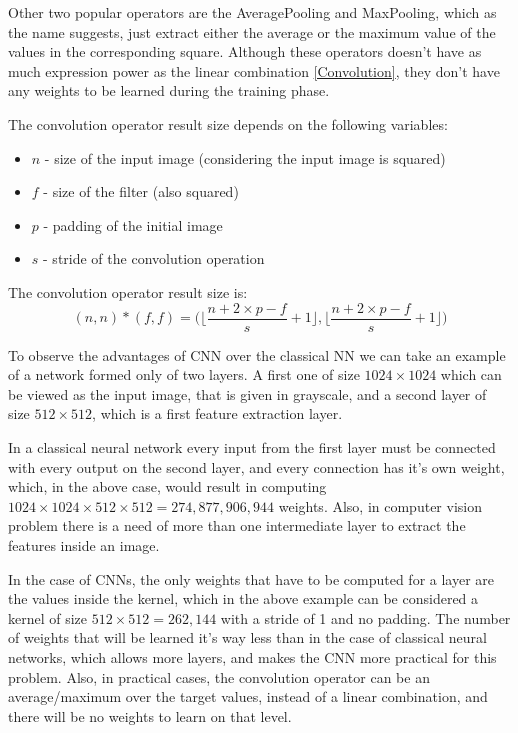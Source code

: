 Other two popular operators are the AveragePooling and MaxPooling, which as the name suggests, just extract either the average or the maximum value of the values in the corresponding square. Although these operators doesn't have as much expression power as the linear combination \ref{Convolution}, they don't have any weights to be learned during the training phase.

The convolution operator result size depends on the following variables:
\begin{itemize}
	\item $n$ - size of the input image (considering the input image is squared)
	\item $f$ - size of the filter (also squared)
	\item $p$ - padding of the initial image
	\item $s$ - stride of the convolution operation
\end{itemize}
The convolution operator result size is:
$$ (n, n) * (f, f) = \bigg( \bigg\lfloor \frac{n + 2 \times p - f}{s} + 1 \bigg\rfloor , \bigg\lfloor \frac{n + 2 \times p - f}{s} + 1 \bigg\rfloor \bigg)$$

To observe the advantages of CNN over the classical NN we can take an example of a network formed only of two layers. A first one of size $1024\times1024$ which can be viewed as the input image, that is given in grayscale, and a second layer of size $512\times512$, which is a first feature extraction layer.

In a classical neural network every input from the first layer must be connected with every output on the second layer, and every connection has it's own weight, which, in the above case, would result in computing $1024 \times 1024 \times 512 \times 512 = 274,877,906,944$ weights. Also, in computer vision problem there is a need of more than one intermediate layer to extract the features inside an image.

In the case of CNNs, the only weights that have to be computed for a layer are the values inside the kernel, which in the above example can be considered a kernel of size $512 \times 512 = 262,144‬$ with a stride of 1 and no padding. The number of weights that will be learned it's way less than in the case of classical neural networks, which allows more layers, and makes the CNN more practical for this problem. Also, in practical cases, the convolution operator can be an average/maximum over the target values, instead of a linear combination, and there will be no weights to learn on that level.

